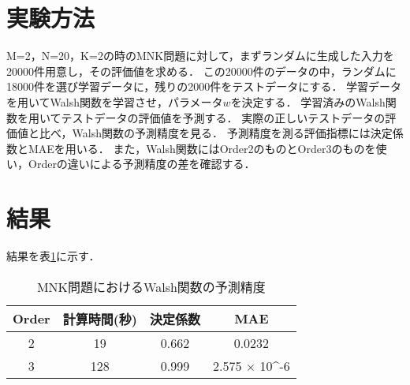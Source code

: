 \documentclass[main]{subfiles}
\begin{document}
        \section{実験方法}
        M=2，N=20，K=2の時のMNK問題に対して，まずランダムに生成した入力を20000件用意し，その評価値を求める．
        この20000件のデータの中，ランダムに18000件を選び学習データに，残りの2000件をテストデータにする．
        学習データを用いてWalsh関数を学習させ，パラメータ$w$を決定する．
        学習済みのWalsh関数を用いてテストデータの評価値を予測する．
        実際の正しいテストデータの評価値と比べ，Walsh関数の予測精度を見る．
        予測精度を測る評価指標には決定係数とMAEを用いる．
        また，Walsh関数にはOrder2のものとOrder3のものを使い，Orderの違いによる予測精度の差を確認する．

        \section{結果}
        結果を表\ref{mnk_result}に示す．
        \begin{table}[h]
            \centering
            \caption{MNK問題におけるWalsh関数の予測精度}
            \begin{tabular}{c|ccc}
              Order & 計算時間(秒) & 決定係数 & MAE\\ \hline
              2 & 19 & 0.662 & 0.0232 \\
              3 & 128 & 0.999 & 2.575 $\times$ 10^{-6} \\
            \end{tabular}
            \label{mnk_result}
        \end{table}
\end{document}
